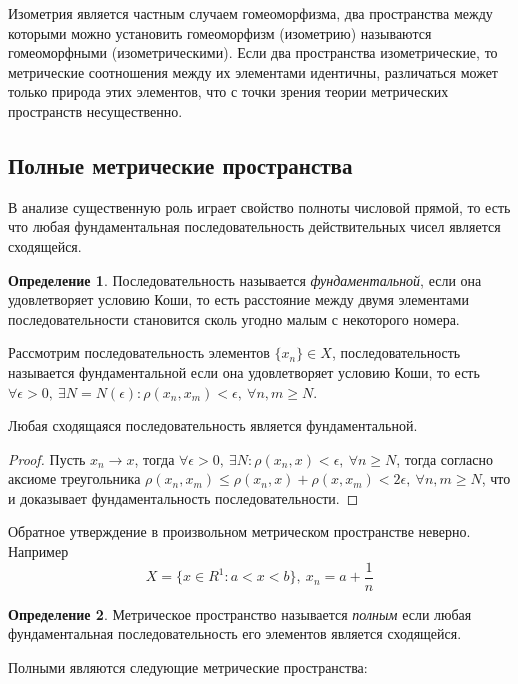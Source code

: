 \documentclass[14pt,a4paper]{extarticle}
\theoremstyle{definition}
\newtheorem{definition}{Определение}[section]
\theoremstyle{remark}
\renewcommand{\[}{\begin{dmath*}[compact]}
\renewcommand{\]}{\end{dmath*}}
\newcommand{\sep}{ , \ \allowbreak }
\newcommand\f[2]{\dfrac{#1}{#2}}
\begin{document}
Изометрия является частным случаем гомеоморфизма, два пространства между
которыми можно установить гомеоморфизм (изометрию) называются гомеоморфными
(изометрическими). Если два пространства изометрические, то метрические
соотношения между их элементами идентичны, различаться может только природа
этих элементов, что с точки зрения теории метрических пространств несущественно.

\subsection{Полные метрические пространства}

В анализе существенную роль играет свойство полноты числовой прямой, то есть
что любая фундаментальная последовательность действительных чисел является
сходящейся.

\begin{definition}
  Последовательность называется \textit{фундаментальной},
  если она удовлетворяет условию Коши,
  то есть расстояние между двумя элементами последовательности становится сколь
  угодно малым с некоторого номера.
\end{definition}

Рассмотрим последовательность элементов $\{x_n\} \in X$,
последовательность называется фундаментальной если она удовлетворяет
условию Коши, то есть $ \forall \epsilon > 0 \sep \exists N = N(\epsilon):
\rho(x_n, x_m) < \epsilon \sep \forall n, m \geq N $.

Любая сходящаяся последовательность является фундаментальной.

\begin{proof}
  Пусть $x_n \to x$, тогда
  $\forall \epsilon > 0 \sep \exists N: \rho(x_n, x) < \epsilon \sep
  \forall n \geq N$,
  тогда согласно аксиоме треугольника
  $\rho(x_n, x_m) \leq \rho(x_n, x)+\rho(x, x_m) < 2\epsilon \sep
  \forall n, m \geq N$,
  что и доказывает фундаментальность последовательности.
\end{proof}

Обратное утверждение в произвольном метрическом пространстве неверно.
Например \[ {X = \{x \in R^1: a < x < b\}} \sep {x_n = a + \f{1}{n}}\] %

\begin{definition}
  Метрическое пространство называется \textit{полным} если любая
  фундаментальная последовательность его элементов является сходящейся.
\end{definition}

Полными являются следующие метрические пространства:
\end{document}
